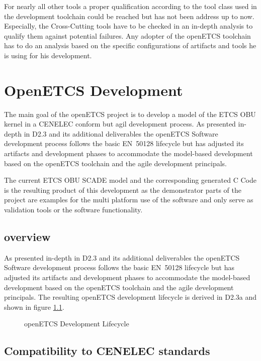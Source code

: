 \documentclass{template/openetcs_report}
\begin{document}
For nearly all other tools a proper qualification according to the tool class used in the development toolchain could be reached but has not been address up to now. Especially, the Cross-Cutting tools have to be checked in an in-depth  analysis to qualify them against potential failures. Any adopter of the openETCS toolchain has to do an analysis based on the specific configurations of artifacts and tools he is using for his development.


\chapter{OpenETCS Development}
\label{sec:development-process}

The main goal of the openETCS project is to develop a model of the ETCS OBU kernel in a CENELEC conform but agil development process. As presented in-depth in D2.3 and its additional deliverables the openETCS Software development process follows the basic EN~50128 lifecycle but has adjusted its artifacts and development phases to accommodate the model-based development based on the openETCS toolchain and the agile development principals. 

The current ETCS OBU SCADE model and the corresponding generated C Code is the resulting product of this development as the demonstrator parts of the project are examples for the multi platform use of the software and only serve as validation tools or the software functionality.

\section{overview}

As presented in-depth in D2.3 and its additional deliverables the openETCS Software development process follows the basic EN~50128 lifecycle but has adjusted its artifacts and development phases to accommodate the model-based development based on the openETCS toolchain and the agile development principals. The resulting openETCS development lifecycle is derived in D2.3a and shown in figure \ref{fig:lifecycle2}.

\begin{figure}[hbt]
  \centering
  \def\svgwidth{.9\textwidth}
  {\tiny
  }
  \caption{openETCS Development Lifecycle}
  \label{fig:lifecycle2}
\end{figure}

\section{Compatibility to CENELEC standards}
\end{document}
